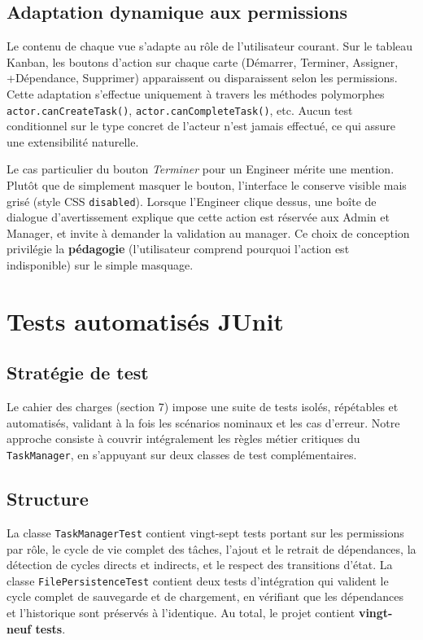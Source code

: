 \documentclass[11pt]{article}
\begin{document}
\subsection{Adaptation dynamique aux permissions}
Le contenu de chaque vue s'adapte au rôle de l'utilisateur courant. Sur
le tableau Kanban, les boutons d'action sur chaque carte (Démarrer,
Terminer, Assigner, +Dépendance, Supprimer) apparaissent ou disparaissent
selon les permissions. Cette adaptation s'effectue uniquement à travers
les méthodes polymorphes \texttt{actor.canCreateTask()},
\texttt{actor.canCompleteTask()}, etc. Aucun test conditionnel sur le
type concret de l'acteur n'est jamais effectué, ce qui assure une
extensibilité naturelle.

Le cas particulier du bouton \textit{Terminer} pour un Engineer mérite
une mention. Plutôt que de simplement masquer le bouton, l'interface le
conserve visible mais grisé (style CSS \texttt{disabled}). Lorsque
l'Engineer clique dessus, une boîte de dialogue d'avertissement explique
que cette action est réservée aux Admin et Manager, et invite à demander
la validation au manager. Ce choix de conception privilégie la
\textbf{pédagogie} (l'utilisateur comprend pourquoi l'action est
indisponible) sur le simple masquage.

\section{Tests automatisés JUnit}

\subsection{Stratégie de test}
Le cahier des charges (section 7) impose une suite de tests isolés,
répétables et automatisés, validant à la fois les scénarios nominaux et
les cas d'erreur. Notre approche consiste à couvrir intégralement les
règles métier critiques du \texttt{TaskManager}, en s'appuyant sur deux
classes de test complémentaires.

\subsection{Structure}
La classe \texttt{TaskManagerTest} contient vingt-sept tests portant sur
les permissions par rôle, le cycle de vie complet des tâches, l'ajout et
le retrait de dépendances, la détection de cycles directs et indirects,
et le respect des transitions d'état. La classe
\texttt{FilePersistenceTest} contient deux tests d'intégration qui
valident le cycle complet de sauvegarde et de chargement, en vérifiant
que les dépendances et l'historique sont préservés à l'identique. Au
total, le projet contient \textbf{vingt-neuf tests}.
\end{document}
